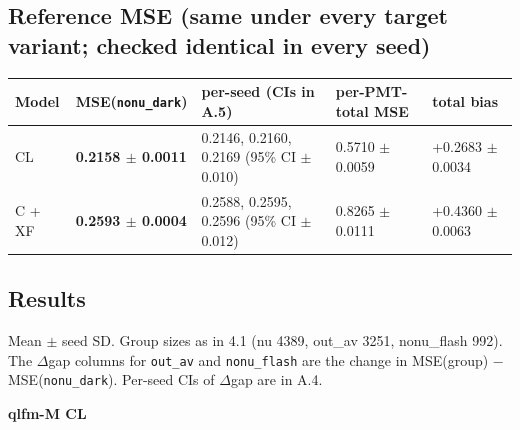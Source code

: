 \documentclass[10pt,a4paper]{article}
\begin{document}
\subsection{Reference MSE (same under every target variant; checked identical in every seed)}
\begin{center}\footnotesize
\setlength{\tabcolsep}{3pt}\renewcommand{\arraystretch}{1.15}
\begin{tabularx}{\linewidth}{LLLLL}
\toprule
\textbf{Model} & \textbf{MSE(\texttt{nonu\_\allowbreak{}dark})} & \textbf{per-seed (CIs in A.5)} & \textbf{per-PMT-total MSE} & \textbf{total bias} \\
\midrule
CL & \textbf{0.2158 $\pm$ 0.0011} & 0.2146, 0.2160, 0.2169 (95\% CI $\pm$0.010) & 0.5710 $\pm$ 0.0059 & +0.2683 $\pm$ 0.0034 \\
C + XF & \textbf{0.2593 $\pm$ 0.0004} & 0.2588, 0.2595, 0.2596 (95\% CI $\pm$0.012) & 0.8265 $\pm$ 0.0111 & +0.4360 $\pm$ 0.0063 \\
\bottomrule
\end{tabularx}
\end{center}
\subsection{Results}
Mean $\pm$ seed SD. Group sizes as in 4.1 (nu 4389, out\_av 3251, nonu\_flash 992). The $\Delta$gap columns for \texttt{out\_\allowbreak{}av} and \texttt{nonu\_\allowbreak{}flash} are the change in MSE(group) $-$ MSE(\texttt{nonu\_\allowbreak{}dark}). Per-seed CIs of $\Delta$gap are in A.4.

\textbf{qlfm-M CL}
\end{document}
